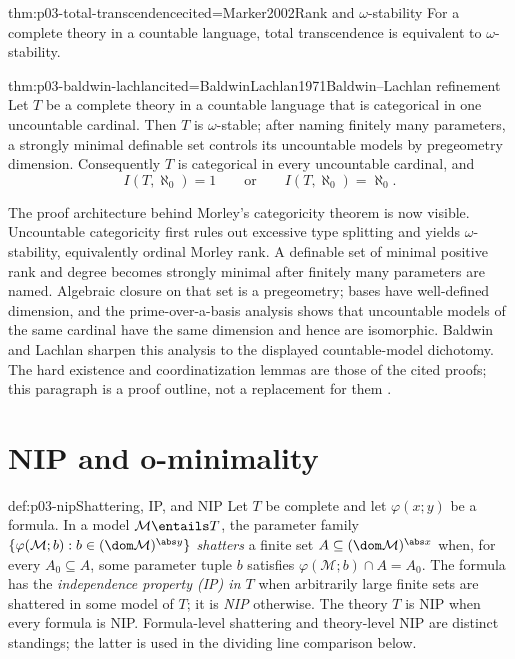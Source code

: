\begin{hbtheorem}{thm:p03-total-transcendence}{cited=Marker2002}{Rank and \(\omega\)-stability}
For a complete theory in a countable language, total transcendence is
equivalent to \(\omega\)-stability.
\end{hbtheorem}

\begin{hbtheorem}{thm:p03-baldwin-lachlan}{cited=BaldwinLachlan1971}{Baldwin--Lachlan refinement}
Let \(T\) be a complete theory in a countable language that is categorical in
one uncountable cardinal.  Then \(T\) is \(\omega\)-stable; after naming
finitely many parameters, a strongly minimal definable set controls its
uncountable models by pregeometry dimension.  Consequently \(T\) is
categorical in every uncountable cardinal, and
\[
  I(T,\aleph_0)=1
  \qquad\text{or}\qquad
  I(T,\aleph_0)=\aleph_0.
\]
\end{hbtheorem}

The proof architecture behind Morley's categoricity theorem is now visible.
Uncountable categoricity first rules out excessive type splitting and yields
\(\omega\)-stability, equivalently ordinal Morley rank.  A definable set of
minimal positive rank and degree becomes strongly minimal after finitely many
parameters are named.  Algebraic closure on that set is a pregeometry; bases
have well-defined dimension, and the prime-over-a-basis analysis shows that
uncountable models of the same cardinal have the same dimension and hence are
isomorphic.  Baldwin and Lachlan sharpen this analysis to the displayed
countable-model dichotomy.  The hard existence and coordinatization lemmas are
those of the cited proofs; this paragraph is a proof outline, not a replacement
for them \cite{Morley1965,BaldwinLachlan1971,Marker2002}.




\section{NIP and o-minimality}
\label{sec:p03-nip-ominimal}

\begin{hbdefinition}{def:p03-nip}{Shattering, IP, and NIP}
Let \(T\) be complete and let \(\varphi(x;y)\) be a formula.  In a model
\(\mathcal M\entails T\), the parameter family
\(\{\varphi(\mathcal M;b):b\in(\dom\mathcal M)^{\abs y}\}\)
\emph{shatters} a finite set
\(A\subseteq(\dom\mathcal M)^{\abs x}\) when, for every \(A_0\subseteq A\),
some parameter tuple \(b\) satisfies
\(\varphi(\mathcal M;b)\cap A=A_0\).  The formula has the
\emph{independence property (IP) in \(T\)} when arbitrarily large finite sets are
shattered in some model of \(T\); it is \emph{NIP} otherwise.  The theory
\(T\) is NIP when every formula is NIP.  Formula-level shattering and
theory-level NIP are distinct standings; the latter is used in the dividing
line comparison below.
\end{hbdefinition}

